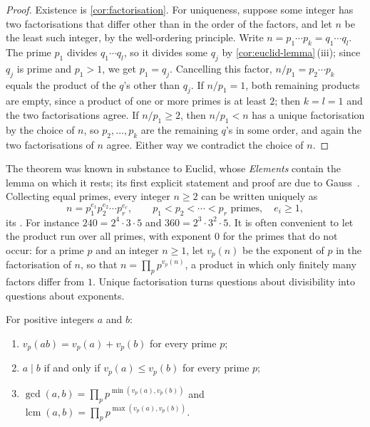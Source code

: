 \begin{proof}
Existence is \cref{cor:factorisation}. For uniqueness, suppose some integer has two factorisations that differ other than in the order of the factors, and let $n$ be the least such integer, by the well-ordering principle. Write $n=p_1\cdots p_k=q_1\cdots q_l$. The prime $p_1$ divides $q_1\cdots q_l$, so it divides some $q_j$ by \cref{cor:euclid-lemma}\,(iii); since $q_j$ is prime and $p_1>1$, we get $p_1=q_j$. Cancelling this factor, $n/p_1=p_2\cdots p_k$ equals the product of the $q$'s other than $q_j$. If $n/p_1=1$, both remaining products are empty, since a product of one or more primes is at least $2$; then $k=l=1$ and the two factorisations agree. If $n/p_1\ge2$, then $n/p_1<n$ has a unique factorisation by the choice of $n$, so $p_2,\ldots,p_k$ are the remaining $q$'s in some order, and again the two factorisations of $n$ agree. Either way we contradict the choice of $n$.
\end{proof}

The theorem was known in substance to Euclid, whose \emph{Elements} contain the lemma on which it rests; its first explicit statement and proof are due to Gauss~\cite{gauss1801,hardywright2008}. Collecting equal primes, every integer $n\ge2$ can be written uniquely as
\[
n=p_1^{e_1}p_2^{e_2}\cdots p_r^{e_r},\qquad p_1<p_2<\cdots<p_r\text{ primes},\quad e_i\ge1,
\]
its . For instance $240=2^4\cdot3\cdot5$ and $360=2^3\cdot3^2\cdot5$. It is often convenient to let the product run over all primes, with exponent $0$ for the primes that do not occur: for a prime $p$ and an integer $n\ge1$, let $v_p(n)$ be the exponent of $p$ in the factorisation of $n$, so that $n=\prod_pp^{v_p(n)}$, a product in which only finitely many factors differ from $1$. Unique factorisation turns questions about divisibility into questions about exponents.

\begin{proposition}
\label{prop:valuations}
For positive integers $a$ and $b$:
\begin{enumerate}
\item $v_p(ab)=v_p(a)+v_p(b)$ for every prime $p$;
\item $a\mid b$ if and only if $v_p(a)\le v_p(b)$ for every prime $p$;
\item $\gcd(a,b)=\prod_pp^{\min(v_p(a),v_p(b))}$ and $\operatorname{lcm}(a,b)=\prod_pp^{\max(v_p(a),v_p(b))}$.
\end{enumerate}
\end{proposition}


